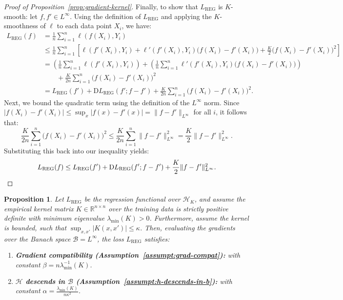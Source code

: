 \documentclass{article}
\newtheorem{proposition}[theorem]{Proposition}
\newcommand{\R}{\mathbb{R}}
\newcommand{\D}{\mathrm{D}}
\begin{document}
\begin{proof}[Proof of Proposition~\ref{prop:gradient-kernel}]
    Finally, to show that $L_\mathrm{REG}$ is $K$-smooth:
    let $f, f' \in L^\infty$. Using the definition of $L_\mathrm{REG}$ and applying the $K$-smoothness of $\ell$ to each data point $X_i$, we have:
    \begin{align*}
        L_\mathrm{REG}(f) 
        &= \frac{1}{n} \sum_{i=1}^n \ell(f(X_i), Y_i) \\
        &\leq \frac{1}{n} \sum_{i=1}^n \left[ \ell(f'(X_i), Y_i) + \ell'(f'(X_i), Y_i) \bigl( f(X_i) - f'(X_i) \bigr) + \frac{K}{2} \bigl( f(X_i) - f'(X_i) \bigr)^2 \right] \\
        &= \left( \frac{1}{n} \sum_{i=1}^n \ell(f'(X_i), Y_i) \right) + \left( \frac{1}{n} \sum_{i=1}^n \ell'(f'(X_i), Y_i) \bigl( f(X_i) - f'(X_i) \bigr) \right) \\
        &\qquad + \frac{K}{2n} \sum_{i=1}^n \bigl( f(X_i) - f'(X_i) \bigr)^2 \\
        &= L_\mathrm{REG}(f') + \D L_\mathrm{REG}(f'; f - f') + \frac{K}{2n} \sum_{i=1}^n \bigl( f(X_i) - f'(X_i) \bigr)^2.
    \end{align*}
    Next, we bound the quadratic term using the definition of the $L^\infty$ norm. Since $\lvert f(X_i) - f'(X_i) \rvert \leq \sup_{x} \lvert f(x) - f'(x) \rvert = \lVert f - f' \rVert_{L^\infty}$ for all $i$, it follows that:
    \[
        \frac{K}{2n} \sum_{i=1}^n \bigl( f(X_i) - f'(X_i) \bigr)^2 \leq \frac{K}{2n} \sum_{i=1}^n \lVert f - f' \rVert_{L^\infty}^2 = \frac{K}{2} \lVert f - f' \rVert_{L^\infty}^2.
    \]
    Substituting this back into our inequality yields:
    \[
        L_\mathrm{REG}(f) \leq L_\mathrm{REG}(f') + \D L_\mathrm{REG}(f'; f - f') + \frac{K}{2} \lVert f - f' \rVert_{L^\infty}^2. \qedhere
    \]
\end{proof}

\begin{proposition}\label{prop:gradient-bridging-rkhs}
    Let $L_\mathrm{REG}$ be the regression functional over $\mathcal{H}_K$, and assume the empirical kernel matrix $K \in \R^{n \times n}$ over the training data is strictly positive definite with minimum eigenvalue $\lambda_{\min}(K) > 0$. Furthermore, assume the kernel is bounded, such that $\sup_{x, x'} \lvert K(x, x') \rvert \leq \kappa$. Then, evaluating the gradients over the Banach space $\mathcal{B} = L^\infty$, the loss $L_\mathrm{REG}$ satisfies:
    \begin{enumerate}
        \item[(i)] \textbf{Gradient compatibility (Assumption~\ref{assumpt:grad-compat}):} with constant $\beta = n \lambda_{\min}^{-1}(K)$.
        \item[(ii)] \textbf{$\mathcal{H}$ descends in $\mathcal{B}$ (Assumption~\ref{assumpt:h-descends-in-b}):} with constant $\alpha = \frac{\lambda_{\min}(K)}{n \kappa^2}$.
    \end{enumerate}
\end{proposition}
\end{document}

